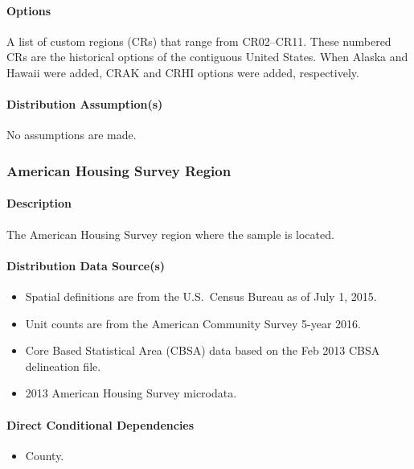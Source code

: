 \paragraph{Options}
A list of custom regions (CRs) that range from CR02--CR11. These numbered CRs are the historical options of the contiguous United States. When Alaska and Hawaii were added, CRAK and CRHI options were added, respectively.

\paragraph{Distribution Assumption(s)}
No assumptions are made.

\subsubsection{American Housing Survey Region}
\paragraph{Description}
The American Housing Survey region where the sample is located.

\paragraph{Distribution Data Source(s)}
\begin{itemize}
    \item Spatial definitions are from the U.S.~Census Bureau as of July 1, 2015.
    \item Unit counts are from the American Community Survey 5-year 2016.
    \item Core Based Statistical Area (CBSA) data based on the Feb 2013 CBSA delineation file.
    \item 2013 American Housing Survey microdata.
\end{itemize}

\paragraph{Direct Conditional Dependencies}
\begin{itemize}
    \item County.
\end{itemize}

